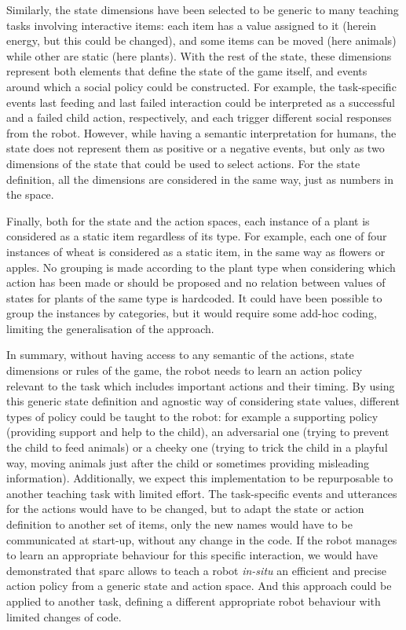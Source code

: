 Similarly, the state dimensions have been selected to be generic to many teaching tasks involving interactive items: each item has a value assigned to it (herein energy, but this could be changed), and some items can be moved (here animals) while other are static (here plants). With the rest of the state, these dimensions represent both elements that define the state of the game itself, and events around which a social policy could be constructed. For example, the task-specific events last feeding and last failed interaction could be interpreted as a successful and a failed child action, respectively, and each trigger different social responses from the robot. However, while having a semantic interpretation for humans, the state does not represent them as positive or a negative events, but only as two dimensions of the state that could be used to select actions. For the state definition, all the dimensions are considered in the same way, just as numbers in the space. 

Finally, both for the state and the action spaces, each instance of a plant is considered as a static item regardless of its type. For example, each one of four instances of wheat is considered as a static item, in the same way as flowers or apples. No grouping is made according to the plant type when considering which action has been made or should be proposed and no relation between values of states for plants of the same type is hardcoded. It could have been possible to group the instances by categories, but it would require some add-hoc coding, limiting the generalisation of the approach. 

In summary, without having access to any semantic of the actions, state dimensions or rules of the game, the robot needs to learn an action policy relevant to the task which includes important actions and their timing. By using this generic state definition and agnostic way of considering state values, different types of policy could be taught to the robot: for example a supporting policy (providing support and help to the child), an adversarial one (trying to prevent the child to feed animals) or a cheeky one (trying to trick the child in a playful way, moving animals just after the child or sometimes providing misleading information). Additionally, we expect this implementation to be repurposable to another teaching task with limited effort. The task-specific events and utterances for the actions would have to be changed, but to adapt the state or action definition to another set of items, only the new names would have to be communicated at start-up, without any change in the code. If the robot manages to learn an appropriate behaviour for this specific interaction, we would have demonstrated that \gls{sparc} allows to teach a robot \emph{in-situ} an efficient and precise action policy from a generic state and action space. And this approach could be applied to another task, defining a different appropriate robot behaviour with limited changes of code.

